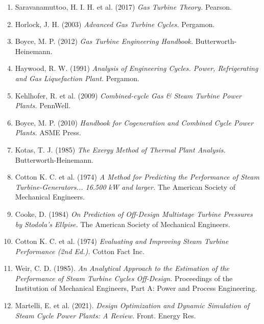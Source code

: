 \documentclass[a4paper]{article}
\begin{document}
\begin{enumerate}

\item Saravanamuttoo, H. I. H. et al. (2017) \textit{Gas Turbine Theory.} Pearson.

\item Horlock, J. H. (2003) \textit{Advanced Gas Turbine Cycles.} Pergamon.

\item Boyce, M. P. (2012) \textit{Gas Turbine Engineering Handbook.} Butterworth-Heinemann.


\item Haywood, R. W. (1991) \textit{Analysis of Engineering Cycles. Power, Refrigerating and Gas Liquefaction Plant.} Pergamon.

\item Kehlhofer, R. et al. (2009) \textit{Combined-cycle Gas \& Steam Turbine Power Plants.} PennWell.

\item Boyce, M. P. (2010) \textit{Handbook for Cogeneration and Combined Cycle Power Plants.} ASME Press.

\item Kotas, T. J. (1985) \textit{The Exergy Method of Thermal Plant Analysis.} \newline Butterworth-Heinemann.

\item Cotton K. C. et al. (1974) \textit{A Method for Predicting the Performance of Steam Turbine-Generators... 16.500 kW and larger.} The American Society of Mechanical Engineers.

\item Cooke, D. (1984) \textit{On Prediction of Off-Design Multistage Turbine Pressures by Stodola’s Ellpise.} The American Society of Mechanical Engineers.

\item Cotton K. C. et al. (1974) \textit{Evaluating and Improving Steam Turbine Performance (2nd Ed.).} Cotton Fact Inc.

\item Weir, C. D. (1985). \textit{An Analytical Approach to the Estimation of the Performance of Steam Turbine Cycles Off-Design.} Proceedings of the Institution of Mechanical Engineers, Part A: Power and Process Engineering.

\item Martelli, E. et al. (2021). \textit{Design Optimization and Dynamic Simulation of Steam Cycle Power Plants: A Review.} Front. Energy Res.


\end{enumerate}
\end{document}
